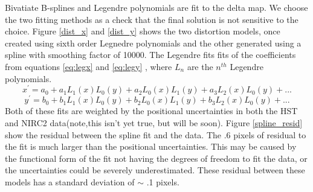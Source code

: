 Bivatiate B-splines and Legendre polynomials are fit to the delta map.  We choose the two fitting methods as a check that the final solution is not sensitive to the choice.  Figure \ref{dist_x} and \ref{dist_y} shows the two distortion models, once created using sixth order Legnedre polynomials and the other generated using a spline with smoothing factor of 10000.  The Legendre fits fits of the coefficients from equations \ref{eq:legx} and \ref{eq:legy} , where $L_{n}$ are the $n^{th}$ Legendre polynomials.  
\begin{equation}
x^{'} = a_{0} + a_{1}L_{1}(x)L_{0}(y) +  a_{2}L_{0}(x)L_{1}(y) + a_{3}L_{2}(x)L_{0}(y)+...
\label{eq:legx}
\end{equation}
\begin{equation}
y^{'} = b_{0} + b_{1}L_{1}(x)L_{0}(y) +  b_{2}L_{0}(x)L_{1}(y) + b_{3}L_{2}(x)L_{0}(y)+...
\label{eq:legy}
\end{equation}
Both of these fits are weighted by the positional uncertainties in both the HST and NIRC2 data(note,this isn't yet true, but will be soon). Figure \ref{spline_resid} show the residual between the spline fit and the data.  The .6 pixels of residual to the fit is much larger than the positional uncertainties.  This may be caused by the functional form of the fit not having the degrees of freedom to fit the data, or the uncertainties could be severely underestimated.   These residual between these models has a standard deviation of $\sim$ .1 pixels.
